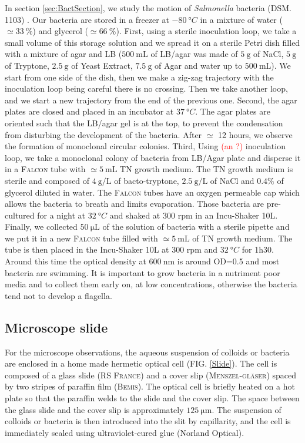 \documentclass[%
 aip,
 jmp,%
 amsmath,amssymb,
reprint,%
]{revtex4-1}
\begin{document}
In section \ref{sec:BactSection}, we study the motion of \textit{Salmonella} bacteria (DSM. 1103) \citep{21_fabrega2013salmonella}. Our bacteria are stored in a freezer at $\SI{-80}{\degree C}$ in a mixture of water ($\simeq \SI{33}{\%}$) and glycerol ($\simeq \SI{66}{\%}$). First, using a sterile inoculation loop, we take a small volume of this storage solution  and we spread it on a sterile Petri dish filled with a mixture of agar and LB ($\SI{500}{\milli\liter}$ of LB/agar was made of $\SI{5}{\gram}$ of NaCl, $\SI{5}{\gram}$ of Tryptone, $\SI{2.5}{\gram}$ of Yeast Extract, $\SI{7.5}{\gram}$ of Agar and water up to $\SI{500}{\milli\liter}$). We start from one side of the dish, then we make a zig-zag trajectory with the inoculation loop being careful there is no crossing. Then we take another loop, and we start a new trajectory from the end of the previous one. Second, the agar plates are closed and placed in an incubator at $\SI{37}{\degree C}$. The agar plates are oriented such that the LB/agar gel is at the top, to prevent the condensation from disturbing the development of the bacteria. After $\simeq$ 12 hours, we observe the formation of monoclonal circular colonies. Third, Using \textcolor{red}{(an ?)} inoculation loop, we take a monoclonal colony of bacteria from LB/Agar plate and disperse it in a \textsc{Falcon} tube with $\simeq \SI{5}{\milli\liter}$ TN growth medium. The TN growth medium is sterile and composed of $\SI{4}{\gram\per\liter}$ of bacto-tryptone, $\SI{2.5}{\gram\per\liter}$ of NaCl and $0.4\%$ of glycerol diluted in water. The \textsc{Falcon} tubes have an oxygen permeable cap which allows the bacteria to breath and limits evaporation. Those bacteria are pre-cultured for a night at $\SI{32}{\degree C}$ and shaked at 300 rpm in an Incu-Shaker 10L. Finally, we collected $\SI{50}{\micro\liter}$ of the solution of bacteria with a sterile pipette and we put it in a new \textsc{Falcon} tube filled with $\simeq \SI{5}{\milli\liter}$ of TN growth medium. The tube is then placed in the Incu-Shaker 10L at 300 rpm and $\SI{32}{\degree C}$ for 1h30. Around this time the optical density at $\SI{600}{\nano\meter}$ is around OD=0.5 and most bacteria are swimming. It is important to grow bacteria in a nutriment poor media and to collect them early on, at low concentrations, otherwise the bacteria tend not to develop a flagella.

\subsection{Microscope slide}
For the microscope observations, the aqueous suspension of colloids or bacteria are enclosed in a home made hermetic optical cell (FIG. \ref{Slide}). The cell is composed of a  glass slide (\textsc{RS France}) and a cover slip (\textsc{Menszel-gl\"aser}) spaced by two stripes of paraffin film (\textsc{Bemis}). The optical cell is briefly heated on a hot plate so that the paraffin welds to the slide and the cover slip. The space between the glass slide and the cover slip is approximately $\SI{125}{\micro\meter}$. The suspension of colloids or bacteria is then introduced into the slit by capillarity, and the cell is immediately sealed using ultraviolet-cured glue (Norland Optical).
\end{document}

